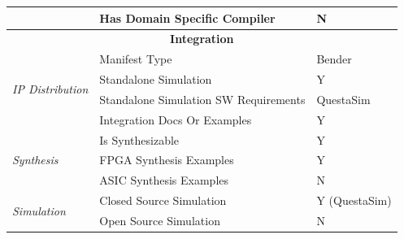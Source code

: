 \begin{table}[h!]
{\begin{tabular}{@{}llp{}@{}}
 & Has Domain Specific Compiler & N \\
\toprule
\multicolumn{3}{c}{\textbf{Integration}} \\ \toprule
\multirow{4}{*}{\textit{IP Distribution}} & Manifest Type & Bender \\
 & Standalone Simulation & Y \\
 & Standalone Simulation SW Requirements & QuestaSim \\
 & Integration Docs Or Examples & Y \\
\midrule
\multirow{3}{*}{\textit{Synthesis}} & Is Synthesizable & Y \\
 & FPGA Synthesis Examples & Y \\
 & ASIC Synthesis Examples & N \\
\midrule
\multirow{2}{*}{\textit{Simulation}} & Closed Source Simulation & Y (QuestaSim) \\
 & Open Source Simulation & N \\
\bottomrule
\end{tabular}%
}
\end{table}